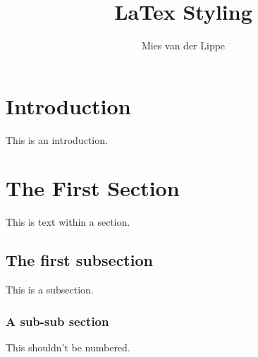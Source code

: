 \documentclass{report}
\author{Mies van der Lippe}
\title{LaTex Styling}
\begin{document}

\tableofcontents
\newpage

\section{Introduction}
This is an introduction. 

\newpage

\section{The First Section}
This is text within a section. 

\subsection{The first subsection}
This is a subsection.

\subsubsection{A sub-sub section}
This shouldn't be numbered. 
\end{document}
